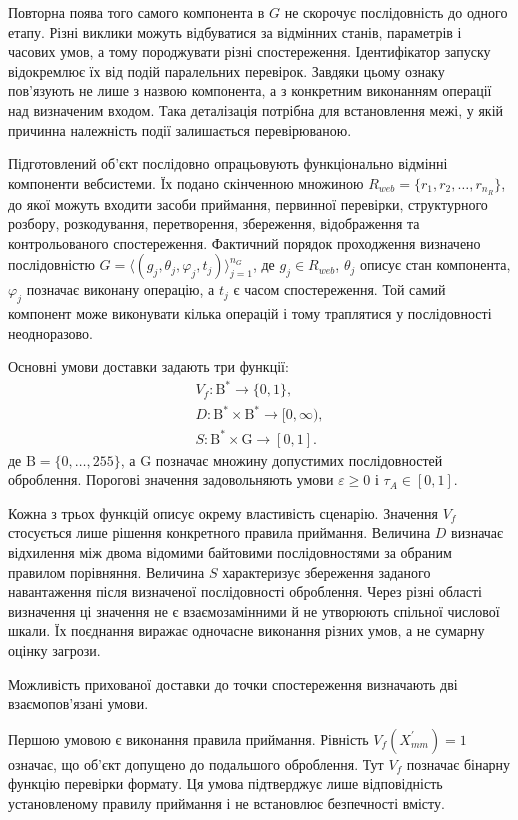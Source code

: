 Повторна поява того самого компонента в $G$ не скорочує послідовність до одного етапу. Різні виклики можуть відбуватися за відмінних станів, параметрів і часових умов, а тому породжувати різні спостереження. Ідентифікатор запуску відокремлює їх від подій паралельних перевірок. Завдяки цьому ознаку пов’язують не лише з назвою компонента, а з конкретним виконанням операції над визначеним входом. Така деталізація потрібна для встановлення межі, у якій причинна належність події залишається перевірюваною.

Підготовлений об’єкт послідовно опрацьовують функціонально відмінні компоненти вебсистеми. Їх подано скінченною множиною $R_{web}=\{r_1,r_2,\ldots,r_{n_R}\}$, до якої можуть входити засоби приймання, первинної перевірки, структурного розбору, розкодування, перетворення, збереження, відображення та контрольованого спостереження. Фактичний порядок проходження визначено послідовністю $G=\langle(g_j,\theta_j,\varphi_j,t_j)\rangle_{j=1}^{n_G}$, де $g_j\in R_{web}$, $\theta_j$ описує стан компонента, $\varphi_j$ позначає виконану операцію, а $t_j$ є часом спостереження. Той самий компонент може виконувати кілька операцій і тому траплятися у послідовності неодноразово.

Основні умови доставки задають три функції:
\[
\begin{gathered}
V_f\colon \mathrm B^{*}\rightarrow\{0,1\},\\
D\colon \mathrm B^{*}\times\mathrm B^{*}\rightarrow[0,\infty),\\
S\colon \mathrm B^{*}\times\mathrm G\rightarrow[0,1].
\end{gathered}
\]
де $\mathrm B=\{0,\ldots,255\}$, а $\mathrm G$ позначає множину допустимих послідовностей оброблення. Порогові значення задовольняють умови $\varepsilon\geq0$ і $\tau_A\in[0,1]$.

Кожна з трьох функцій описує окрему властивість сценарію. Значення $V_f$ стосується лише рішення конкретного правила приймання. Величина $D$ визначає відхилення між двома відомими байтовими послідовностями за обраним правилом порівняння. Величина $S$ характеризує збереження заданого навантаження після визначеної послідовності оброблення. Через різні області визначення ці значення не є взаємозамінними й не утворюють спільної числової шкали. Їх поєднання виражає одночасне виконання різних умов, а не сумарну оцінку загрози.

Можливість прихованої доставки до точки спостереження визначають дві взаємопов’язані умови.

Першою умовою є виконання правила приймання. Рівність $V_f(X_{mm}^{\prime})=1$ означає, що об’єкт допущено до подальшого оброблення. Тут $V_f$ позначає бінарну функцію перевірки формату. Ця умова підтверджує лише відповідність установленому правилу приймання і не встановлює безпечності вмісту.

